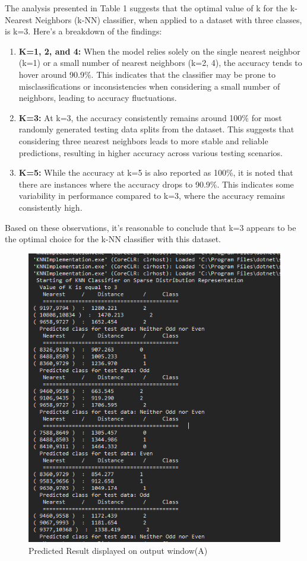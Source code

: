 \documentclass[conference]{IEEEtran}
\begin{document}
The analysis presented in Table 1 suggests that the optimal value of k for the k-Nearest Neighbors (k-NN) classifier, when applied to a dataset with three classes, is k=3. Here's a breakdown of the findings:
\begin{enumerate}
    \item \textbf{K=1, 2, and 4:} When the model relies solely on the single nearest neighbor (k=1) or a small number of nearest neighbors (k=2, 4), the accuracy tends to hover around 90.9\%. This indicates that the classifier may be prone to misclassifications or inconsistencies when considering a small number of neighbors, leading to accuracy fluctuations.

\item \textbf{K=3:} At k=3, the accuracy consistently remains around 100\% for most randomly generated testing data splits from the dataset. This suggests that considering three nearest neighbors leads to more stable and reliable predictions, resulting in higher accuracy across various testing scenarios.
\item \textbf{K=5:} While the accuracy at k=5 is also reported as 100\%, it is noted that there are instances where the accuracy drops to 90.9\%. This indicates some variability in performance compared to k=3, where the accuracy remains consistently high.
    
\end{enumerate}


Based on these observations, it's reasonable to conclude that k=3 appears to be the optimal choice for the k-NN classifier with this dataset.

\begin{figure}
    \centering
    \includegraphics[width=1.0\linewidth]{Picture1.png}
    \caption{Predicted Result displayed on output window(A)}
    \label{fig :enter-label}
\end{figure}
\end{document}
